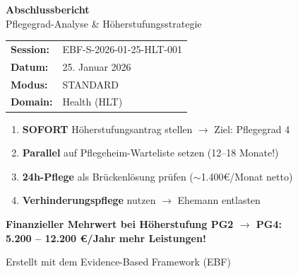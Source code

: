 \documentclass[11pt,a4paper]{article}
\begin{document}
\begin{titlepage}
    \centering
    \vspace*{2cm}

    {\Huge\bfseries\color{primaryblue} Abschlussbericht}\\[0.5cm]
    {\LARGE Pflegegrad-Analyse \& Höherstufungsstrategie}\\[2cm]

    \begin{tcolorbox}[colback=lightgray, colframe=gray, width=12cm]
        \centering
        \begin{tabular}{ll}
            \textbf{Session:} & EBF-S-2026-01-25-HLT-001 \\
            \textbf{Datum:} & 25. Januar 2026 \\
            \textbf{Modus:} & STANDARD \\
            \textbf{Domain:} & Health (HLT) \\
        \end{tabular}
    \end{tcolorbox}

    \vspace{2cm}

    \begin{infobox}[Kernempfehlung]
        \begin{enumerate}
            \item \textbf{SOFORT} Höherstufungsantrag stellen $\rightarrow$ Ziel: Pflegegrad 4
            \item \textbf{Parallel} auf Pflegeheim-Warteliste setzen (12--18 Monate!)
            \item \textbf{24h-Pflege} als Brückenlösung prüfen ($\sim$1.400\euro{}/Monat netto)
            \item \textbf{Verhinderungspflege} nutzen $\rightarrow$ Ehemann entlasten
        \end{enumerate}
    \end{infobox}

    \vspace{2cm}

    {\large\textbf{Finanzieller Mehrwert bei Höherstufung PG2 $\rightarrow$ PG4:}}\\[0.5cm]
    {\Large\color{successgreen}\textbf{5.200 -- 12.200 \euro{}/Jahr mehr Leistungen!}}

    \vfill

    {\small Erstellt mit dem Evidence-Based Framework (EBF)}

\end{titlepage}
\end{document}
